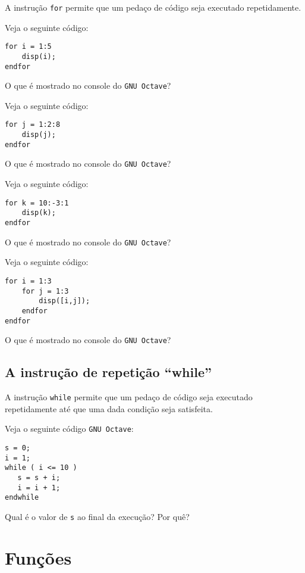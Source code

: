 A instrução \verb+for+ permite que um pedaço de código seja executado repetidamente.

\begin{ex}
  Veja o seguinte código:
\begin{verbatim}
for i = 1:5
    disp(i);
endfor
\end{verbatim}
O que é mostrado no console do \verb+GNU Octave+?
\end{ex}

\begin{ex}
  Veja o seguinte código:
\begin{verbatim}
for j = 1:2:8
    disp(j);
endfor
\end{verbatim}
O que é mostrado no console do \verb+GNU Octave+?
\end{ex}

\begin{ex}
  Veja o seguinte código:
\begin{verbatim}
for k = 10:-3:1
    disp(k);
endfor
\end{verbatim}
O que é mostrado no console do \verb+GNU Octave+?
\end{ex}

\begin{ex}
  Veja o seguinte código:
\begin{verbatim}
for i = 1:3
    for j = 1:3
        disp([i,j]);
    endfor
endfor
\end{verbatim}
O que é mostrado no console do \verb+GNU Octave+?
\end{ex}

\subsection{A instrução de repetição ``while''}

A instrução \verb+while+ permite que um pedaço de código seja executado repetidamente até que uma dada condição seja satisfeita.

\begin{ex}
Veja o seguinte código \verb+GNU Octave+:
\begin{verbatim}
s = 0;
i = 1;
while ( i <= 10 )
   s = s + i;
   i = i + 1;
endwhile
\end{verbatim}
Qual é o valor de \verb+s+ ao final da execução? Por quê?
\end{ex}

\section{Funções}

